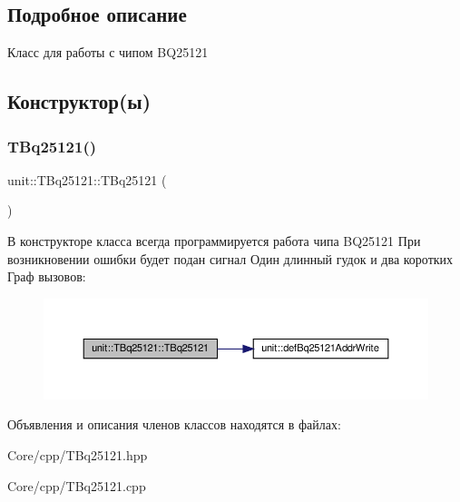 \subsection{Подробное описание}
Класс для работы с чипом B\+Q25121 

\subsection{Конструктор(ы)}
\mbox{\label{classunit_1_1_t_bq25121_ae620c44c80792004e5ed25182964d419}} 
\subsubsection{\texorpdfstring{T\+Bq25121()}{TBq25121()}}
{\footnotesize\ttfamily unit\+::\+T\+Bq25121\+::\+T\+Bq25121 (\begin{DoxyParamCaption}{ }\end{DoxyParamCaption})}

В конструкторе класса всегда программируется работа чипа B\+Q25121 При возникновении ошибки будет подан сигнал Один длинный гудок и два коротких Граф вызовов\+:\nopagebreak
\begin{figure}[H]
\begin{center}
\leavevmode
\includegraphics[width=350pt]{classunit_1_1_t_bq25121_ae620c44c80792004e5ed25182964d419_cgraph}
\end{center}
\end{figure}


Объявления и описания членов классов находятся в файлах\+:\begin{DoxyCompactItemize}
\item 
Core/cpp/T\+Bq25121.\+hpp\item 
Core/cpp/T\+Bq25121.\+cpp\end{DoxyCompactItemize}
